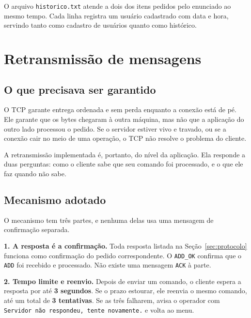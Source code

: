 \documentclass[12pt,a4paper]{article}
\begin{document}
O arquivo \texttt{historico.txt} atende a dois dos itens pedidos pelo enunciado
ao mesmo tempo. Cada linha registra um usuário cadastrado com data e hora,
servindo tanto como cadastro de usuários quanto como histórico.

\section{Retransmissão de mensagens}
\label{sec:retransmissao}

\subsection{O que precisava ser garantido}

O TCP garante entrega ordenada e sem perda enquanto a conexão está de pé. Ele
garante que os bytes chegaram à outra máquina, mas não que a aplicação do outro
lado processou o pedido. Se o servidor estiver vivo e travado, ou se a conexão
cair no meio de uma operação, o TCP não resolve o problema do cliente.

A retransmissão implementada é, portanto, do nível da aplicação. Ela responde a
duas perguntas: como o cliente sabe que seu comando foi processado, e o que ele
faz quando não sabe.

\subsection{Mecanismo adotado}

O mecanismo tem três partes, e nenhuma delas usa uma mensagem de confirmação
separada.

\vspace{6pt}
\noindent\textbf{1. A resposta é a confirmação.} Toda resposta listada na
Seção~\ref{sec:protocolo} funciona como confirmação do pedido correspondente. O
\texttt{ADD\_OK} confirma que o \texttt{ADD} foi recebido e processado. Não
existe uma mensagem \texttt{ACK} à parte.

\vspace{6pt}
\noindent\textbf{2. Tempo limite e reenvio.} Depois de enviar um comando, o
cliente espera a resposta por até \textbf{3 segundos}. Se o prazo estourar, ele
reenvia o mesmo comando, até um total de \textbf{3 tentativas}. Se as três
falharem, avisa o operador com \texttt{Servidor não respondeu, tente novamente.}
e volta ao menu.
\end{document}
